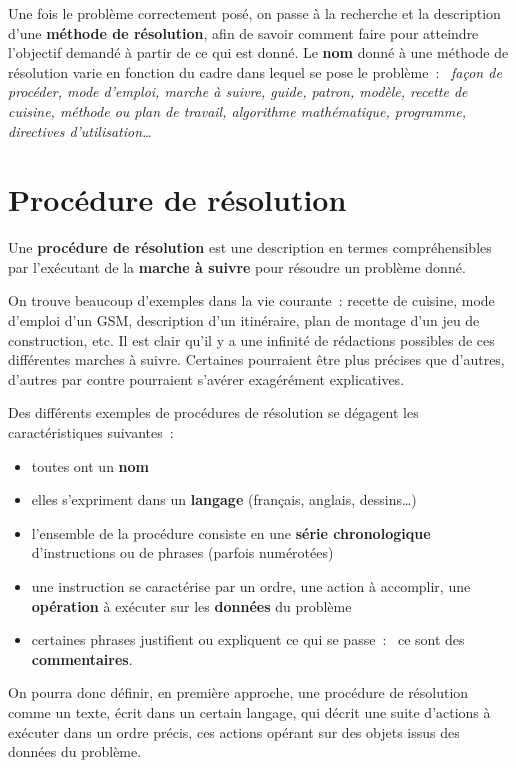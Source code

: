 			Une fois le problème correctement posé, 
			on passe à la recherche et la description 
			d’une \textbf{méthode de résolution}, 
			afin de savoir comment faire 
			pour atteindre l’objectif demandé 
			à partir de ce qui est donné. 
			Le \textbf{nom} donné à une méthode de résolution 
			varie en fonction du cadre dans lequel se pose le problème~:~
			\textit{façon de procéder, mode d’emploi, marche à suivre, 
			guide, patron, modèle, recette de cuisine, 
			méthode ou plan de travail, algorithme mathématique, 
			programme, directives d’utilisation\dots}
	
	\section{Procédure de résolution}
	
		Une \textbf{procédure de résolution} est une description 
		en termes compréhensibles par l’exécutant 
		de la \textbf{marche à suivre} 
		pour résoudre un problème donné.
		
		On trouve beaucoup d’exemples dans la vie courante~:
		recette de cuisine, mode d’emploi d’un GSM, 
		description d’un itinéraire, 
		plan de montage d’un jeu de construction, etc. 
		Il est clair qu’il y a une infinité de rédactions possibles 
		de ces différentes marches à suivre. 
		Certaines pourraient être plus précises que d’autres,
		d’autres par contre pourraient s’avérer exagérément explicatives.		

		Des différents exemples de procédures de résolution 
		se dégagent les caractéristiques suivantes~:	
		\begin{itemize}
		\item 
			toutes ont un \textbf{nom}
		\item 
			elles s’expriment dans un \textbf{langage}
			(français, anglais, dessins\dots)
		\item 
			l’ensemble de la procédure consiste 
			en une \textbf{série chronologique}
			d’instructions ou de phrases (parfois numérotées)
		\item 
			une instruction se caractérise par un ordre, 
			une action à accomplir,
			une \textbf{opération} à exécuter 
			sur les \textbf{données} du problème
		\item 
			certaines phrases justifient ou expliquent ce qui se passe~:~
			ce sont des \textbf{commentaires}.
		\end{itemize}
	
		On pourra donc définir, en première approche, 
		une procédure de résolution comme un texte, 
		écrit dans un certain langage, 
		qui décrit une suite d’actions à exécuter dans un ordre précis, 
		ces actions opérant sur des objets issus des données du problème.
	
